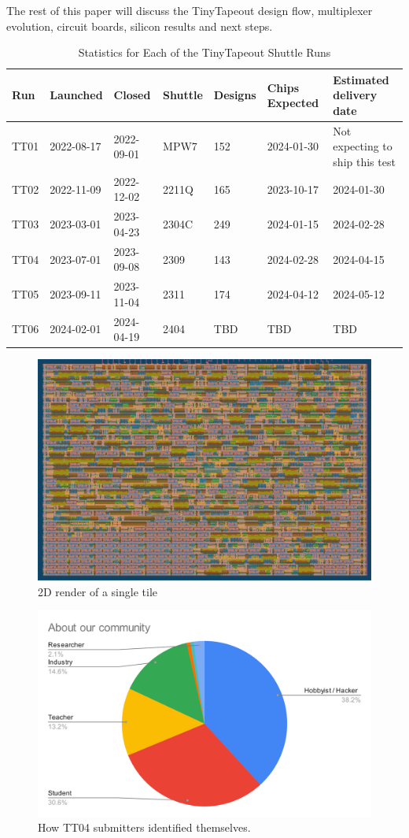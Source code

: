 The rest of this paper will discuss the TinyTapeout design flow, multiplexer evolution, circuit boards, silicon results and next steps.

\begin{table}[!t]
\centering
\caption{Statistics for Each of the TinyTapeout Shuttle Runs}
\label{tab:tinytapeout}
\begin{tabularx}{\textwidth}{@{}l *{6}{X}@{}}
\toprule
\textbf{Run} & \textbf{Launched} & \textbf{Closed} & \textbf{Shuttle} & \textbf{Designs} & \textbf{Chips Expected} & \textbf{Estimated delivery date} \\
\midrule
TT01 & 2022-08-17 & 2022-09-01 & MPW7  & 152 & 2024-01-30 & Not expecting to ship this test \\
TT02 & 2022-11-09 & 2022-12-02 & 2211Q & 165 & 2023-10-17 & 2024-01-30 \\
TT03 & 2023-03-01 & 2023-04-23 & 2304C & 249 & 2024-01-15 & 2024-02-28 \\
TT04 & 2023-07-01 & 2023-09-08 & 2309  & 143 & 2024-02-28 & 2024-04-15 \\
TT05 & 2023-09-11 & 2023-11-04 & 2311  & 174 & 2024-04-12 & 2024-05-12 \\
TT06 & 2024-02-01 & 2024-04-19 & 2404  & TBD & TBD        & TBD \\
\bottomrule
\end{tabularx}
\end{table}

\begin{figure}[!t]
\centering
\includegraphics[width=\columnwidth]{./Figs/gh action gds layout.png}
\caption{2D render of a single tile}
\label{fig:render_cells_in_use}
\end{figure}

\begin{figure}[!t]
\centering
\includegraphics[width=\columnwidth]{./Figs/about our community pie chart.png}
\caption{How TT04 submitters identified themselves.}
\label{fig:TT04_submitters}
\end{figure}
